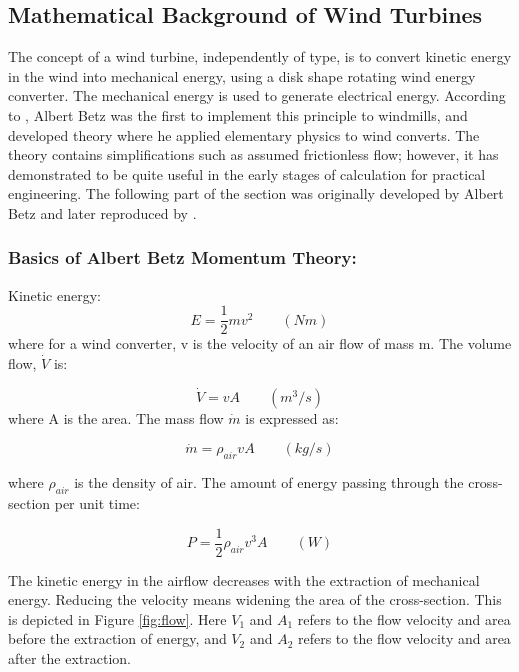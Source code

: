 \cite{Lynn2011}

\subsection{Mathematical Background of Wind Turbines}
The concept of a wind turbine, independently of type, is to convert kinetic energy in the wind into mechanical energy, using a disk shape rotating wind energy converter. The mechanical energy is used to generate electrical energy.  According to \cite{Hau2013},  Albert Betz was the first to implement this principle to windmills, and developed theory where he applied elementary physics to wind converts. The theory contains simplifications such as assumed frictionless flow; however, it has demonstrated to be quite useful in the early stages of calculation for practical engineering. The following part of the section was originally developed by Albert Betz and later reproduced by \cite{Hau2013}.

\subsubsection{Basics of Albert Betz Momentum Theory:}
\noindent Kinetic energy:
\begin{equation}
    E=\frac{1}{2} m v^2 \qquad (Nm)
\end{equation}
 where for a wind converter, v is the velocity of an air flow of mass m. The volume flow, $\dot V$ is:
 
 \begin{equation}
    \dot V= v A \qquad (m^3/s)
\end{equation}
where A is the area. The mass flow $\dot m$ is expressed as:

 \begin{equation}
    \dot m = \rho_{air} v A \qquad (kg/s)
\end{equation}

\noindent where $\rho_{air}$ is the density of air. The amount of energy passing through the cross-section per unit time:

 \begin{equation}
    P = \frac{1}{2}\rho_{air} v^3 A \qquad (W)
\end{equation}

\noindent  The kinetic energy in the airflow decreases with the extraction of mechanical energy. Reducing the velocity means widening the area of the cross-section. This is depicted in Figure \ref{fig:flow}. Here $V_1$ and  $A_1$ refers to the flow velocity and area before the extraction of energy, and $V_2$ and $A_2$ refers to the flow velocity and area after the extraction.

